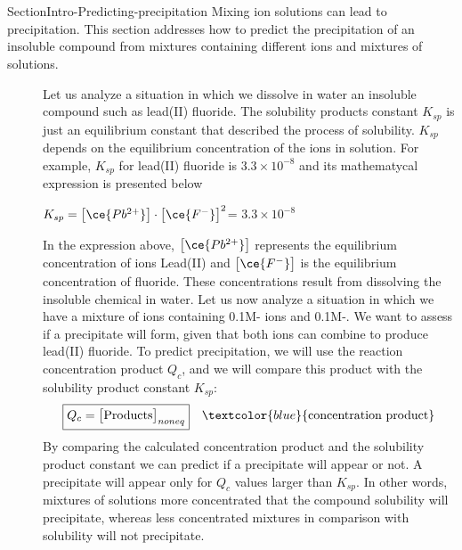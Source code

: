 \documentclass[main.tex]{subfiles}
\newcommand\chapterlabel{Ch-solubility}\setcounter{figurenewcounter}{0}\setcounter{tablenewcounter}{0}\setcounter{formulanewcounter}{0}
\begin{document}
\section{\color{blue!30!black}{Predicting precipitation from mixtures and solutions}} {SectionIntro-Predicting-precipitation}
Mixing ion solutions can lead to precipitation. This section addresses how to predict the precipitation of an insoluble compound from mixtures containing different ions and mixtures of solutions. 
 \sloppy
\begin{description}
\item[] 
Let us analyze a situation in which we dissolve in water an insoluble compound such as lead(II) fluoride. The solubility products constant $K_{sp}$ is just an equilibrium constant that described the process of solubility. $K_{sp}$ depends on the equilibrium concentration of the ions in solution. For example, $K_{sp}$ for lead(II) fluoride is $3.3\times10^{-8}$ and its mathematycal expression is presented below
\begin{center}\hfill $K_{sp}= \big[ \ce{Pb^{2+}} \big]\cdot \big[ \ce{F^{-}} \big]^2$= $3.3\times10^{-8}$\end{center}
In the expression above, $\big[ \ce{Pb^{2+}} \big]$ represents the equilibrium concentration of ions Lead(II) and $\big[ \ce{F^{-}} \big]$ is the equilibrium concentration of fluoride. These concentrations result from dissolving the insoluble chemical in water.
Let us now analyze a situation in which we have a mixture of ions containing 0.1M- ions and 0.1M-. We want to assess if a precipitate will form, given that both ions can combine to produce lead(II) fluoride. To predict precipitation, we will use the reaction concentration product $Q_c$, and we will compare this product with the solubility product constant $K_{sp}$:
\begin{equation}
\boxed{  Q_{c}=\big[\text{Products}\big]_{noneq} } \quad \textcolor{blue}{\text{concentration product}}\label{\chapterlabel:equation4}
\end{equation}
By comparing the calculated concentration product and the solubility product constant we can predict if a precipitate will appear or not. A precipitate will appear only for $Q_c$ values larger than $K_{sp}$. In other words, mixtures of solutions more concentrated that the compound solubility will precipitate, whereas  less concentrated mixtures in comparison with solubility will not precipitate.


\end{description}
\end{document}
